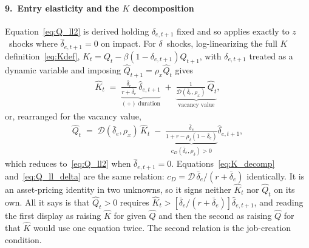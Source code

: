 \documentclass[authoryear, review, 12pt]{elsarticle}
\begin{document}
\paragraph{9.\ Entry elasticity and the $K$ decomposition}
Equation~\eqref{eq:Q_ll2} is derived holding $\delta_{e,t+1}$ fixed and so
applies exactly to $z$~shocks where $\hat\delta_{e,t+1}=0$ on impact.
For $\delta$~shocks, log-linearizing the full $K$ definition~\eqref{eq:Kdef},
$K_t=Q_t-\beta(1-\delta_{e,t+1})Q_{t+1}$, with $\delta_{e,t+1}$ treated as a
dynamic variable and imposing $\hat{Q}_{t+1}=\rho_x\hat{Q}_t$ gives
\begin{align}\label{eq:K_decomp}
    \hat{K}_t
    \;=\;
    \underbrace{\frac{\bar\delta_e}{r+\bar\delta_e}\,\hat\delta_{e,t+1}}_{\displaystyle(+)\;\text{duration}}
    \;+\;
    \underbrace{\frac{1}{\mathcal{D}(\bar\delta_e,\rho_x)}\,\hat{Q}_t}_{\displaystyle\text{vacancy value}},
\end{align}
or, rearranged for the vacancy value,
\begin{align}\label{eq:Q_ll_delta}
    \hat{Q}_t
    \;=\;
    \mathcal{D}(\bar\delta_e,\rho_x)\,\hat{K}_t
    \;-\;
    \underbrace{\frac{\bar\delta_e}{1+r-\rho_\delta(1-\bar\delta_e)}}_{\displaystyle c_D(\bar\delta_e,\rho_\delta)>0}
    \hat\delta_{e,t+1},
\end{align}
which reduces to~\eqref{eq:Q_ll2} when $\hat\delta_{e,t+1}=0$.
Equations~\eqref{eq:K_decomp} and~\eqref{eq:Q_ll_delta} are the same relation:
$c_D=\mathcal{D}\,\bar\delta_e/(r+\bar\delta_e)$ identically.  It is an
asset-pricing identity in two unknowns, so it signs neither $\hat{K}_t$ nor
$\hat{Q}_t$ on its own.  All it says is that $\hat{Q}_t>0$ requires
$\hat{K}_t>[\bar\delta_e/(r+\bar\delta_e)]\hat\delta_{e,t+1}$, and reading the
first display as raising $\hat{K}$ for given $\hat{Q}$ and then the second as
raising $\hat{Q}$ for that $\hat{K}$ would use one equation twice.  The second
relation is the job-creation condition.
\end{document}

